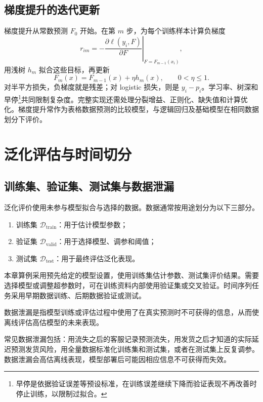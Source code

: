\subsection{梯度提升的迭代更新}
梯度提升从常数预测 \(F_0\) 开始。在第 \(m\) 步，为每个训练样本计算负梯度
\[
r_{im}=-\left.\frac{\partial\ell(y_i,F)}{\partial F}
\right|_{F=F_{m-1}(x_i)},
\]
用浅树 \(h_m\) 拟合这些目标，再更新
\[
F_m(x)=F_{m-1}(x)+\eta h_m(x),\qquad 0<\eta\le1.
\]
对半平方损失，负梯度就是残差；对 logistic 损失，则是 \(y_i-p_i\)。学习率、树深和早停\footnote{早停是依据验证误差等预设标准，在训练误差继续下降而验证表现不再改善时停止训练，以限制过拟合。}共同限制复杂度。完整实现还需处理分裂增益、正则化、缺失值和计算优化。梯度提升常作为表格数据预测的比较模型，与逻辑回归及基础模型在相同数据划分下评价。

\section{泛化评估与时间切分}
\subsection{训练集、验证集、测试集与数据泄漏}

泛化评价使用未参与模型拟合与选择的数据。数据通常按用途划分为以下三部分。
\begin{enumerate}
  \item 训练集 \(\mathcal D_{\mathrm{train}}\)：用于估计模型参数；
  \item 验证集 \(\mathcal D_{\mathrm{valid}}\)：用于选择模型、调参和阈值；
  \item 测试集 \(\mathcal D_{\mathrm{test}}\)：用于最终评估泛化表现。
\end{enumerate}

本章算例采用预先给定的模型设置，使用训练集估计参数、测试集评价结果。需要选择模型或调整超参数时，可在训练资料内部使用验证集或交叉验证。时间序列任务采用早期数据训练、后期数据验证或测试。

\begin{definition}[数据泄漏]
数据泄漏是指模型训练或评估过程中使用了在真实预测时不可获得的信息，从而使离线评估高估模型的未来表现。
\end{definition}

常见数据泄漏包括：用流失之后的客服记录预测流失，用发货之后才知道的实际延迟预测发货风险，用全量数据标准化训练集和测试集，或者在测试集上反复调参。数据泄漏会高估离线表现，模型部署后可能因相应信息不可获得而失效。


